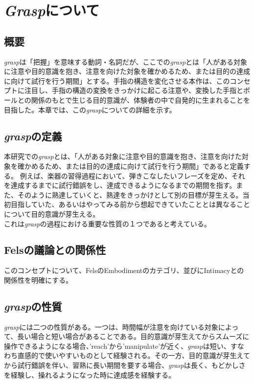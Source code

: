 \chapter{\textit{Grasp}について}
\label{define_model}

\section{概要}
\textit{grasp}は「把握」を意味する動詞・名詞だが、ここでの\textit{grasp}とは「人がある対象に注意や目的意識を抱き、注意を向けた対象を確かめるため、または目的の達成に向けて試行を行う期間」とする。手指の構造を変化させる本作は、このコンセプトに注目し、手指の構造の変換をきっかけに起こる注意や、変換した手指とボールとの関係のもとで生じる目的意識が、体験者の中で自発的に生まれることを目指した。本章では、この\textit{grasp}についての詳細を示す。\\

\section{\textit{grasp}の定義}
本研究での\textit{grasp}とは、「人がある対象に注意や目的意識を抱き、注意を向けた対象を確かめるため、または目的の達成に向けて試行を行う期間」であると定義する。
例えば、楽器の習得過程において、弾きこなしたいフレーズを定め、それを達成するまでに試行錯誤をし、達成できるようになるまでの期間を指す。また、そのように熟達していくと、熟達をきっかけとして別の目標が芽生える。当初目指していた、あるいはやってみる前から想起できていたこととは異なることについて目的意識が芽生える。\\
これは\textit{grasp}の過程における重要な性質の１つであると考えている。

\section{Felsの議論との関係性}
このコンセプトについて、FelsのEmbodimentのカテゴリ、並びにIntimacyとの関係性を明確にする。\\

\section{\textit{grasp}の性質}
\textit{grasp}には二つの性質がある。一つは、時間幅が注意を向けている対象によって、長い場合と短い場合があることである。目的意識が芽生えてからスムーズに操作できるようになる場合、'reach'から'manipulate'が近く、\textit{grasp}は短い、すなわち直感的で使いやすいものとして経験される。その一方、目的意識が芽生えてから試行錯誤を伴い、習熟に長い期間を要する場合、\textit{grasp}は長く、もどかしさを経験し、操れるようになった時に達成感を経験する。\\

